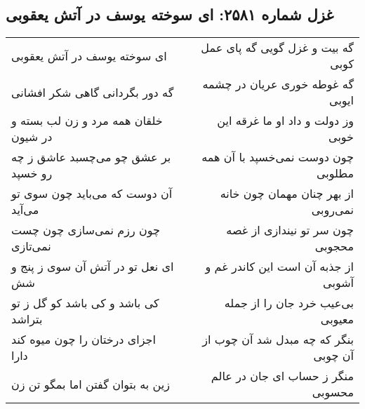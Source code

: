 \begin{center}
\section*{غزل شماره ۲۵۸۱: ای سوخته یوسف در آتش یعقوبی}
\label{sec:2581}
\begin{longtable}{l p{0.5cm} r}
ای سوخته یوسف در آتش یعقوبی
&&
گه بیت و غزل گویی گه پای عمل کوبی
\\
گه دور بگردانی گاهی شکر افشانی
&&
گه غوطه خوری عریان در چشمه ایوبی
\\
خلقان همه مرد و زن لب بسته و در شیون
&&
وز دولت و داد او ما غرقه این خوبی
\\
بر عشق چو می‌چسبد عاشق ز چه رو خسپد
&&
چون دوست نمی‌خسپد با آن همه مطلوبی
\\
آن دوست که می‌باید چون سوی تو می‌آید
&&
از بهر چنان مهمان چون خانه نمی‌روبی
\\
چون رزم نمی‌سازی چون چست نمی‌تازی
&&
چون سر تو نیندازی از غصه محجوبی
\\
ای نعل تو در آتش آن سوی ز پنج و شش
&&
از جذبه آن است این کاندر غم و آشوبی
\\
کی باشد و کی باشد کو گل ز تو بتراشد
&&
بی‌عیب خرد جان را از جمله معیوبی
\\
اجزای درختان را چون میوه کند دارا
&&
بنگر که چه مبدل شد آن چوب از آن چوبی
\\
زین به بتوان گفتن اما بمگو تن زن
&&
منگر ز حساب ای جان در عالم محسوبی
\\
\end{longtable}
\end{center}
